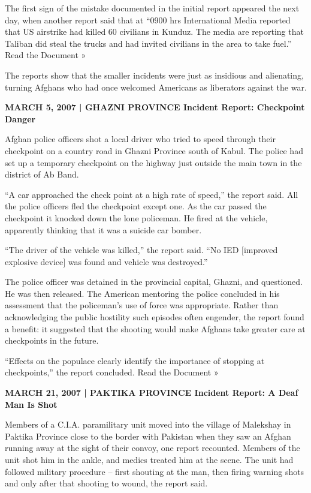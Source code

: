 ﻿\documentclass[12pt]{article}
\begin{document}
The first sign of the mistake documented in the initial report appeared the next day, when another
report said that at ``0900 hrs International Media reported that US airstrike had killed 60
civilians in Kunduz. The media are reporting that Taliban did steal the trucks and had invited
civilians in the area to take fuel.'' Read the Document »

The reports show that the smaller incidents were just as insidious and alienating, turning Afghans
who had once welcomed Americans as liberators against the war.

\textbf{MARCH 5, 2007 | GHAZNI PROVINCE Incident Report: Checkpoint Danger}

Afghan police officers shot a local driver who tried to speed through their checkpoint on a country
road in Ghazni Province south of Kabul. The police had set up a temporary checkpoint on the highway
just outside the main town in the district of Ab Band.

``A car approached the check point at a high rate of speed,'' the report said. All the police
officers fled the checkpoint except one. As the car passed the checkpoint it knocked down the lone
policeman. He fired at the vehicle, apparently thinking that it was a suicide car bomber.

``The driver of the vehicle was killed,'' the report said. ``No IED $[$improved explosive device$]$
was found and vehicle was destroyed.''

The police officer was detained in the provincial capital, Ghazni, and questioned. He was then
released. The American mentoring the police concluded in his assessment that the policeman's use of
force was appropriate. Rather than acknowledging the public hostility such episodes often engender,
the report found a benefit: it suggested that the shooting would make Afghans take greater care at
checkpoints in the future.

``Effects on the populace clearly identify the importance of stopping at checkpoints,'' the report
concluded. Read the Document »

\textbf{MARCH 21, 2007 | PAKTIKA PROVINCE Incident Report: A Deaf Man Is Shot}

Members of a C.I.A. paramilitary unit moved into the village of Malekshay in Paktika Province close
to the border with Pakistan when they saw an Afghan running away at the sight of their convoy, one
report recounted. Members of the unit shot him in the ankle, and medics treated him at the scene.
The unit had followed military procedure -- first shouting at the man, then firing warning shots and
only after that shooting to wound, the report said.
\end{document}
